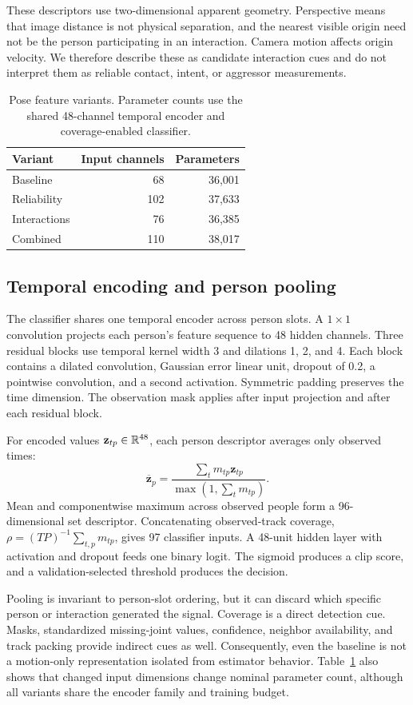 These descriptors use two-dimensional apparent geometry. Perspective means that image distance is not physical separation, and the nearest visible origin need not be the person participating in an interaction. Camera motion affects origin velocity. We therefore describe these as candidate interaction cues and do not interpret them as reliable contact, intent, or aggressor measurements.

\begin{table}[t]
\caption{Pose feature variants. Parameter counts use the shared 48-channel temporal encoder and coverage-enabled classifier.}
\label{tab:variants}\centering
\begin{tabular}{lrr}
\toprule Variant & Input channels & Parameters\\
\midrule Baseline & 68 & 36,001\\
Reliability & 102 & 37,633\\
Interactions & 76 & 36,385\\
Combined & 110 & 38,017\\
\bottomrule
\end{tabular}
\end{table}

\subsection{Temporal encoding and person pooling}
The classifier shares one temporal encoder across person slots. A $1\times1$ convolution projects each person's feature sequence to 48 hidden channels. Three residual blocks use temporal kernel width 3 and dilations 1, 2, and 4. Each block contains a dilated convolution, Gaussian error linear unit, dropout of 0.2, a pointwise convolution, and a second activation. Symmetric padding preserves the time dimension. The observation mask applies after input projection and after each residual block.

For encoded values $\mathbf{z}_{tp}\in\mathbb{R}^{48}$, each person descriptor averages only observed times:
\begin{equation}
\overline{\mathbf{z}}_p=
\frac{\sum_t m_{tp}\mathbf{z}_{tp}}
{\max(1,\sum_t m_{tp})}.
\end{equation}
Mean and componentwise maximum across observed people form a 96-dimensional set descriptor. Concatenating observed-track coverage, $\rho=(TP)^{-1}\sum_{t,p}m_{tp}$, gives 97 classifier inputs. A 48-unit hidden layer with activation and dropout feeds one binary logit. The sigmoid produces a clip score, and a validation-selected threshold produces the decision.

Pooling is invariant to person-slot ordering, but it can discard which specific person or interaction generated the signal. Coverage is a direct detection cue. Masks, standardized missing-joint values, confidence, neighbor availability, and track packing provide indirect cues as well. Consequently, even the baseline is not a motion-only representation isolated from estimator behavior. Table~\ref{tab:variants} also shows that changed input dimensions change nominal parameter count, although all variants share the encoder family and training budget.
